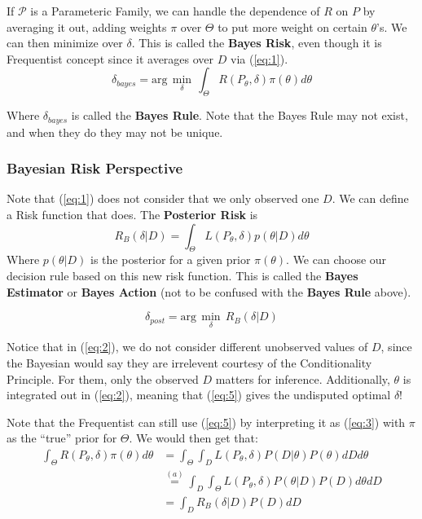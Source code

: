 \documentclass[]{article}
\begin{document}
If \(\mathcal{P}\) is a Parameteric Family, we can handle the dependence of \(R\) on \(P\) by averaging it out, adding weights \(\pi\) over $\Theta$ to put more weight on certain $\theta$'s. We can then minimize over \(\delta\). This is called the \textbf{Bayes Risk}, even though it is Frequentist concept since it averages over $D$ via (\ref{eq:1}).
\begin{equation}\label{eq:3}
\delta_{bayes}= \text{arg}\,\min\limits_{\delta}\,\int_{\Theta}^{}R(P_\theta,\delta)\pi(\theta)d\theta
\end{equation}

Where $\delta_{bayes}$ is called the \textbf{Bayes Rule}. Note that the Bayes Rule may not exist, and when they do they may not be unique.

\subsubsection{Bayesian Risk Perspective} 

Note that (\ref{eq:1}) does not consider that we only observed one \(D\). We can define a Risk function that does. The \textbf{Posterior Risk} is
\begin{equation}\label{eq:2}R_B(\delta|D) = \int_{\Theta}^{}L(P_{\theta},\delta)p(\theta|D)d\theta
\end{equation}
Where $p(\theta|D)$ is the posterior for a given prior $\pi(\theta)$. We can choose our decision rule based on this new risk function. This is called the \textbf{Bayes Estimator} or \textbf{Bayes Action} (not to be confused with the \textbf{Bayes Rule} above).

\begin{equation}\label{eq:5}
\delta_{post}= \text{arg}\,\min\limits_{\delta}\,R_B(\delta|D)
\end{equation}


Notice that in (\ref{eq:2}), we do not consider different unobserved values of \(D\), since the Bayesian would say they are irrelevent courtesy of the Conditionality Principle. For them, only the observed $D$ matters for inference. 
Additionally, \(\theta\) is integrated out in (\ref{eq:2}), meaning that (\ref{eq:5}) gives the undisputed optimal \(\delta\)! 

Note that the Frequentist can still use (\ref{eq:5}) by interpreting it as (\ref{eq:3}) with \(\pi\) as the ``true'' prior for \(\Theta\).
We would then get that:
\begin{align*}
 \int_{\Theta}^{}R(P_\theta,\delta)\pi(\theta)d\theta &= \int_{\Theta}^{}\int_{D}L(P_\theta,\delta)P(D|\theta)P(\theta)dDd\theta \\&\overset{(a)}{=} \int_{D}^{}\int_{\Theta}L(P_\theta,\delta)P(\theta|D)P(D)d\theta dD\\
&=\int_{D}^{}R_B(\delta|D)P(D)dD
\end{align*}
\end{document}
